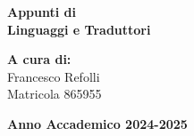 \documentclass[a4paper,12pt,oneside]{book}
\begin{document}
    
    \begin{titlepage}
        
	\vspace{40mm}
        
	\begin{center}
            {\LARGE{
                    \textbf{Appunti di \\ Linguaggi e Traduttori}
                    \par
            }}
        \end{center}
        
        \vspace{50mm}

        \begin{flushright}
            {\large \textbf{A cura di:}} \\
            \large{Francesco Refolli} \\
            \large{Matricola 865955} \\
        \end{flushright}
        
        \vspace{40mm}
        \begin{center}
            {\large{\bf Anno Accademico 2024-2025}}
        \end{center}

        \restoregeometry
        
    \end{titlepage}
    
    \printindex

    
    
\end{document}

